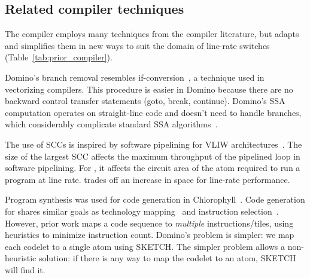 \subsection{Related compiler techniques}
\label{ss:related_compiler}

The \pktlanguage compiler employs many techniques from the compiler literature,
but adapts and simplifies them in new ways to suit the domain of line-rate
switches (Table~\ref{tab:prior_compiler}).

Domino's branch removal resembles if-conversion~\cite{if_conversion}, a
technique used in vectorizing compilers. This procedure is easier in Domino
because there are no backward control transfer statements (goto, break,
continue). Domino's SSA computation operates on straight-line code and doesn't
need to handle branches, which considerably complicate standard SSA
algorithms~\cite{ssa}.

The use of SCCs is inspired by software pipelining for VLIW
architectures~\cite{software_pipelining}. The size of the largest SCC affects
the maximum throughput of the pipelined loop in software pipelining. For
\pktlanguage, it affects the circuit area of the atom required to run a program
at line rate. \pktlanguage trades off an increase in space for line-rate
performance.

Program synthesis was used for code generation in
Chlorophyll~\cite{chlorophyll}.  Code generation for \pktlanguage shares
similar goals as technology mapping~\cite{micheli, flowmap, spectransform} and
instruction selection~\cite{muchnik}.  However, prior work maps a code sequence
to \textit{multiple} instructions/tiles, using heuristics to minimize
instruction count. Domino's problem is simpler: we map each codelet to a single
atom using SKETCH.  The simpler problem allows a non-heuristic solution: if
there is any way to map the codelet to an atom, SKETCH will find it.
